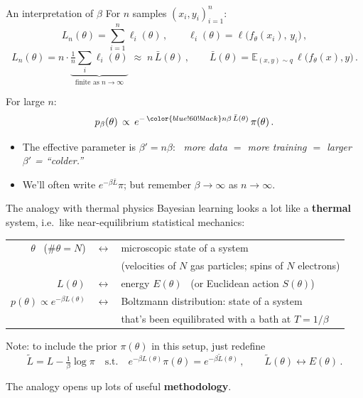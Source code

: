 \documentclass[11pt]{beamer}
\newcommand{\E}{\mathbb{E}}
\newcommand{\hl}[1]{{\color{blue!60!black}\textbf{#1}}}
\begin{document}
\begin{frame}{An interpretation of $\beta$}
  For $n$ samples $(x_i, y_i)_{i=1}^n$:
  \[
    L_n(\theta) = \sum_{i=1}^n \ell_i(\theta)\,,\qquad
    \ell_i(\theta) = \ell\big(f_\theta(x_i),\, y_i\big)\,,
  \]
  \[
    L_n(\theta) = n \cdot \underbrace{\tfrac1n \sum_i
    \ell_i(\theta)}_{\text{finite as } n\to\infty}
    \;\approx\; n\, \bar L(\theta)\,,\qquad
    \bar L(\theta) = \E_{(x,y)\sim q}\, \ell\big(f_\theta(x), y\big)\,.
  \]
  \vspace{1mm}

  For large $n$:
  \[ p_\beta(\theta) \,\propto\, e^{-\,\hl{$n\beta$}\, \bar L(\theta)}\,\pi(\theta)\,. \]
  \vspace{-.5cm}
  \begin{itemize}
    \item The effective parameter is $\beta' = n\beta$: \ \emph{more data
      $=$ more training $=$ larger $\beta'$ =  ``colder.''}
    \item We'll often write $e^{-\beta \bar L}\pi$;  but remember
      $\beta\to\infty$ as $n\to\infty$.
  \end{itemize}
\end{frame}

\begin{frame}{The analogy with thermal physics}
  Bayesian learning looks a lot like a \hl{thermal} system,
  i.e.\ like near-equilibrium statistical mechanics:
  \vspace{-.5cm}
  \begin{center}
  \renewcommand{\arraystretch}{1.35}
  \begin{tabular}{r@{\;\;}c@{\;\;}l}
    $\theta$ \ ($\#\theta = N$) &$\leftrightarrow$& microscopic state of a system \\[-2pt]
    && \footnotesize (velocities of $N$ gas particles; spins of $N$ electrons) \\
    $L(\theta)$ &$\leftrightarrow$& energy $E(\theta)$ \ (or Euclidean action $S(\theta)$) \\
    $p(\theta) \propto e^{-\beta L(\theta)}$ &$\leftrightarrow$& Boltzmann distribution:
      state of a system \\[-2pt]
    && that's been equilibrated with a bath at
      $T = 1/\beta$ \\
  \end{tabular}
  \end{center}
  \vspace{2mm}
  Note: to include the prior $\pi(\theta)$ in this setup, just redefine
  \[
    \tilde L = L - \tfrac1\beta \log\pi
    \quad\text{s.t.}\quad
    e^{-\beta L(\theta)}\pi(\theta) = e^{-\beta \tilde L(\theta)}\,,\qquad
    \tilde L(\theta) \leftrightarrow E(\theta)\,.
  \]
  \vspace{-.2cm}

  The analogy opens up lots of useful \hl{methodology}.
\end{frame}
\end{document}
